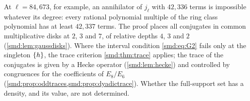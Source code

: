 At $\ell=84{,}673$, for example, an annihilator of $j_\ell$ with $42{,}336$ terms is
impossible whatever its degree: every rational polynomial multiple of the ring class
polynomial has at least $42{,}337$ terms. The proof places all conjugates in common
multiplicative disks at $2$, $3$ and $7$, of relative depths $4$, $3$ and $2$
(\cref{smd:lem:gaussdisks}). Where the interval condition \eqref{smd:eq:G2} fails only at
the singleton $\{h\}$, the trace criterion \cref{smd:thm:trace} applies; the trace of the
conjugates is given by a Hecke operator (\cref{smd:lem:hecke}) and controlled by
congruences for the coefficients of $E_8/E_6$
(\cref{smd:prop:oddtraces,smd:prop:dyadictrace}). Whether the full-support set has a
density, and its value, are not determined.


